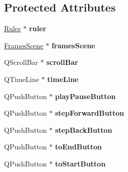 \subsection*{\-Protected \-Attributes}
\begin{DoxyCompactItemize}
\item 
\hypertarget{class_time_line_aa9b91e09fb7f4b59c5d8f7873068f9c8}{
\hyperlink{class_ruler}{\-Ruler} $\ast$ {\bfseries ruler}}
\label{class_time_line_aa9b91e09fb7f4b59c5d8f7873068f9c8}

\item 
\hypertarget{class_time_line_a74af8b15bf9b1337b7efc46a05de0b97}{
\hyperlink{class_frames_scene}{\-Frames\-Scene} $\ast$ {\bfseries frames\-Scene}}
\label{class_time_line_a74af8b15bf9b1337b7efc46a05de0b97}

\item 
\hypertarget{class_time_line_a29964b36fd611914655aa83598e77005}{
\-Q\-Scroll\-Bar $\ast$ {\bfseries scroll\-Bar}}
\label{class_time_line_a29964b36fd611914655aa83598e77005}

\item 
\hypertarget{class_time_line_a5ad46c15886c6d07648294945257bf26}{
\-Q\-Time\-Line $\ast$ {\bfseries time\-Line}}
\label{class_time_line_a5ad46c15886c6d07648294945257bf26}

\item 
\hypertarget{class_time_line_a3514d70155d5098aa6548900ee94b931}{
\-Q\-Push\-Button $\ast$ {\bfseries play\-Pause\-Button}}
\label{class_time_line_a3514d70155d5098aa6548900ee94b931}

\item 
\hypertarget{class_time_line_aac872ef61e6710d4a2ac9a82d3635612}{
\-Q\-Push\-Button $\ast$ {\bfseries step\-Forward\-Button}}
\label{class_time_line_aac872ef61e6710d4a2ac9a82d3635612}

\item 
\hypertarget{class_time_line_add389d8b126218ce2f004001de15ba72}{
\-Q\-Push\-Button $\ast$ {\bfseries step\-Back\-Button}}
\label{class_time_line_add389d8b126218ce2f004001de15ba72}

\item 
\hypertarget{class_time_line_acd33fef483f1a83a593ff3f8a5060f6b}{
\-Q\-Push\-Button $\ast$ {\bfseries to\-End\-Button}}
\label{class_time_line_acd33fef483f1a83a593ff3f8a5060f6b}

\item 
\hypertarget{class_time_line_a840d3369f9c6130746d37843ae0e6646}{
\-Q\-Push\-Button $\ast$ {\bfseries to\-Start\-Button}}
\label{class_time_line_a840d3369f9c6130746d37843ae0e6646}


\end{DoxyCompactItemize}
